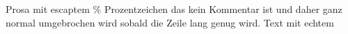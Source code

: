 Prosa mit escaptem \% Prozentzeichen das kein Kommentar ist und daher ganz normal umgebrochen wird sobald die Zeile lang genug wird.
Text mit echtem %
